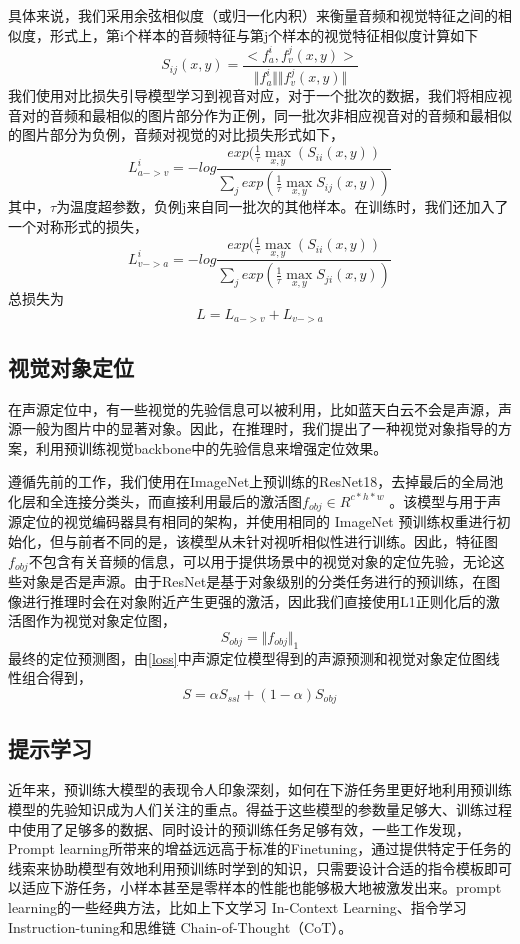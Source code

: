 \documentclass[12pt]{article}
\begin{document}
具体来说，我们采用余弦相似度（或归一化内积）来衡量音频和视觉特征之间的相似度，形式上，第i个样本的音频特征与第j个样本的视觉特征相似度计算如下
\[S_{ij}(x,y)=\frac{<f_a^i,f_v^j(x,y)>}{\Vert f_a^i\Vert \Vert f_v^j(x,y) \Vert}\]
我们使用对比损失引导模型学习到视音对应，对于一个批次的数据，我们将相应视音对的音频和最相似的图片部分作为正例，同一批次非相应视音对的音频和最相似的图片部分为负例，音频对视觉的对比损失形式如下，
\begin{equation}
L_{a->v}^i=-log\frac{exp(\frac{1}{\tau}\mathop{\max}_{x,y}(S_{ii}(x,y))}{\mathop{\sum}_{j}exp(\frac{1}{\tau}\mathop{\max}_{x,y}S_{ij}(x,y))}
\end{equation}
其中，$\tau$为温度超参数，负例j来自同一批次的其他样本。在训练时，我们还加入了一个对称形式的损失，
\begin{equation}
L_{v->a}^i=-log\frac{exp(\frac{1}{\tau}\mathop{\max}_{x,y}(S_{ii}(x,y))}{\mathop{\sum}_{j}exp(\frac{1}{\tau}\mathop{\max}_{x,y}S_{ji}(x,y))}
\end{equation}
总损失为
\[L=L_{a->v}+L_{v->a}\]
\subsection{视觉对象定位}
在声源定位中，有一些视觉的先验信息可以被利用，比如蓝天白云不会是声源，声源一般为图片中的显著对象。因此，在推理时，我们提出了一种视觉对象指导的方案，利用预训练视觉backbone中的先验信息来增强定位效果。

遵循先前的工作\cite{22}，我们使用在ImageNet上预训练的ResNet18，去掉最后的全局池化层和全连接分类头，而直接利用最后的激活图$f_{obj} \in R^{c*h*w}$ 。该模型与用于声源定位的视觉编码器具有相同的架构，并使用相同的 ImageNet 预训练权重进行初始化，但与前者不同的是，该模型从未针对视听相似性进行训练。因此，特征图$f_{obj}$不包含有关音频的信息，可以用于提供场景中的视觉对象的定位先验，无论这些对象是否是声源。由于ResNet是基于对象级别的分类任务进行的预训练，在图像进行推理时会在对象附近产生更强的激活，因此我们直接使用L1正则化后的激活图作为视觉对象定位图，
\[S_{obj}=\Vert f_{obj} \Vert_1\]
最终的定位预测图，由\ref{loss}中声源定位模型得到的声源预测和视觉对象定位图线性组合得到，
\[S=\alpha S_{ssl}+(1-\alpha)S_{obj}\]
\subsection{提示学习}\label{sampler}
近年来，预训练大模型的表现令人印象深刻，如何在下游任务里更好地利用预训练模型的先验知识成为人们关注的重点。得益于这些模型的参数量足够大、训练过程中使用了足够多的数据、同时设计的预训练任务足够有效，一些工作发现，Prompt learning所带来的增益远远高于标准的Finetuning，通过提供特定于任务的线索来协助模型有效地利用预训练时学到的知识，只需要设计合适的指令模板即可以适应下游任务，小样本甚至是零样本的性能也能够极大地被激发出来。prompt learning的一些经典方法，比如上下文学习 In-Context Learning、指令学习 Instruction-tuning和思维链 Chain-of-Thought（CoT）。
\end{document}

